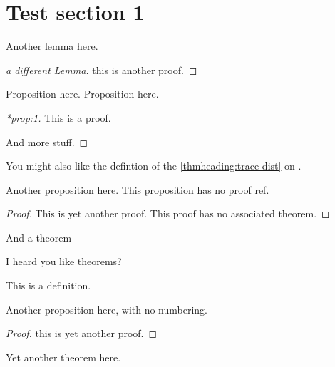 \documentclass[12pt]{article}
\begin{document}
\sloppy


\section{Test section 1}

\begin{lemma}
\label{lem:1}
Another lemma here.
\end{lemma}
\begin{proof}[a different Lemma]
  this is another proof.
\end{proof}


\begin{proposition}
  \label{prop:1}
  Proposition here.  Proposition here.
\end{proposition}
\begin{proof}[*prop:1]
  This is a proof.

  And more stuff.
\end{proof}


You might also like the defintion of the \ref{thmheading:trace-dist} on .

\begin{proposition}
  \noproofref
  Another proposition here.  This proposition has no proof ref.
\end{proposition}

\begin{proof}
  This is yet another proof.  This proof has no associated theorem.
\end{proof}


\begin{theorem}
\label{thm:1}
And a theorem
\end{theorem}


\begin{theorem}
\noproofref
\label{thm:2}
I heard you like theorems?
\end{theorem}

\begin{definition*}
This is a definition.
\end{definition*}


\begin{proposition*}
Another proposition here, with no numbering.
\end{proposition*}
\begin{proof}
  this is yet another proof.
\end{proof}

\begin{theorem}
  \label{thm:another}
  Yet another theorem here.
\end{theorem}
\end{document}
